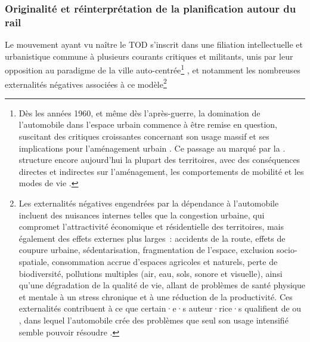 \begin{refsegment}
\subsubsection*{Originalité et réinterprétation de la planification autour du rail
    \label{chap1:tod-presentation-generale-origines-originalite}
    }

Le mouvement ayant vu naître le \acrshort{TOD} s'inscrit dans une filiation intellectuelle et urbanistique commune à plusieurs courants critiques et militants, unis par leur opposition au paradigme de la ville auto-centrée\footnote{
    Dès les années 1960, et même dès l'après-guerre, la domination de l’automobile dans l’espace urbain commence à être remise en question, suscitant des critiques croissantes concernant son usage massif et ses implications pour l’aménagement urbain \textcolor{blue}{\autocites{jacobs_death_1961}{illich_energie_1973}}. Ce passage au  \textcolor{blue}{\autocite[4]{newman_land_1996}} marqué par la  \textcolor{blue}{\autocite[157]{urry_social_2003}}. structure encore aujourd'hui la plupart des territoires, avec des conséquences directes et indirectes sur l'aménagement, les comportements de mobilité et les modes de vie \textcolor{blue}{\autocite[40]{sebban_complementarite_2003}}.
} \textcolor{blue}{\autocites{jacobs_death_1961}{illich_energie_1973}}, et notamment les nombreuses externalités négatives associées à ce modèle\footnote{
    Les externalités négatives engendrées par la dépendance à l’automobile incluent des nuisances internes telles que la congestion urbaine, qui compromet l’attractivité économique et résidentielle des territoires, mais également des effets externes plus larges~: accidents de la route, effets de \gls{coupure urbaine}, sédentarisation, fragmentation de l’espace, exclusion socio-spatiale, consommation accrue d’espaces agricoles et naturels, perte de biodiversité, pollutions multiples (air, eau, sols, sonore et visuelle), ainsi qu’une dégradation de la qualité de vie, allant de problèmes de santé physique et mentale à un stress chronique et à une réduction de la productivité. Ces externalités contribuent à ce que certain·e·s auteur·rice·s qualifient de  ou , dans lequel l’automobile crée des problèmes que seul son usage intensifié semble pouvoir résoudre \textcolor{blue}{\autocites[62]{cervero_transit_1998}[4]{heran_reduction_2001}[2]{heran_zones_2009}}.
}
\end{refsegment}
